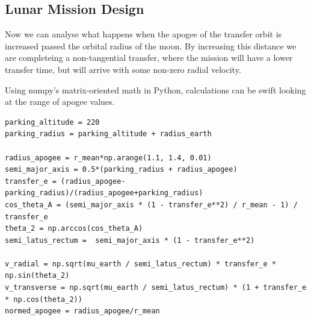 \documentclass[12pt,twocolumn]{article}  %
\begin{document}
\subsection{Lunar Mission Design}

\noindent Now we can analyse what happens when the apogee of the transfer orbit is increased passed the 
orbital radius of the moon. By increasing this distance 
we are completeing a non-tangential transfer, where the mission will have a lower transfer time, but will arrive
with some non-zero radial velocity.

Using numpy's matrix-oriented math in Python, calculations can be swift looking at the range of apogee values.
\begin{lstlisting}
parking_altitude = 220
parking_radius = parking_altitude + radius_earth

radius_apogee = r_mean*np.arange(1.1, 1.4, 0.01)
semi_major_axis = 0.5*(parking_radius + radius_apogee)
transfer_e = (radius_apogee-parking_radius)/(radius_apogee+parking_radius)
cos_theta_A = (semi_major_axis * (1 - transfer_e**2) / r_mean - 1) / transfer_e
theta_2 = np.arccos(cos_theta_A)
semi_latus_rectum =  semi_major_axis * (1 - transfer_e**2)

v_radial = np.sqrt(mu_earth / semi_latus_rectum) * transfer_e * np.sin(theta_2)
v_transverse = np.sqrt(mu_earth / semi_latus_rectum) * (1 + transfer_e * np.cos(theta_2))
normed_apogee = radius_apogee/r_mean
\end{lstlisting} 
\end{document}
